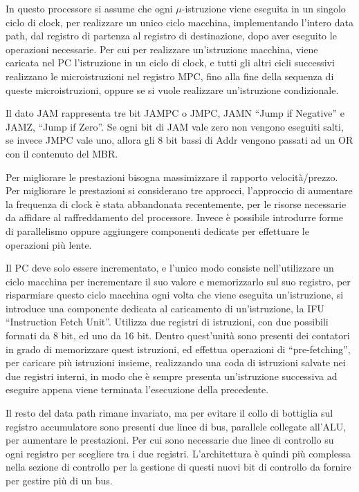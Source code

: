 \documentclass{article}
\numberwithin{equation}{subsection}
\begin{document}
In questo processore si assume che ogni $\mu$-istruzione viene eseguita in un singolo ciclo di clock, per realizzare un unico ciclo macchina, implementando l'intero data 
path, dal registro di partenza al registro di destinazione, dopo aver eseguito le operazioni necessarie. Per cui per realizzare un'istruzione macchina, viene caricata nel 
PC l'istruzione in un ciclo di clock, e tutti gli altri cicli successivi realizzano le microistruzioni nel registro MPC, fino alla fine della sequenza di queste 
microistruzioni, oppure se si vuole realizzare un'istruzione condizionale. 

Il dato JAM rappresenta tre bit JAMPC o JMPC, JAMN ``Jump if Negative'' e JAMZ, ``Jump if Zero''. Se ogni bit di JAM vale zero non vengono eseguiti salti, se invece JMPC vale 
uno, allora gli 8 bit bassi di Addr vengono passati ad un OR con il contenuto del MBR. 


Per migliorare le prestazioni bisogna massimizzare il rapporto velocità/prezzo. Per migliorare le prestazioni si considerano tre approcci, l'approccio di aumentare la frequenza 
di clock è stata abbandonata recentemente, per le risorse necessarie da affidare al raffreddamento del processore. Invece è possibile introdurre forme di parallelismo oppure 
aggiungere componenti dedicate per effettuare le operazioni più lente. 


Il PC deve solo essere incrementato, e l'unico modo consiste nell'utilizzare un ciclo macchina per incrementare il suo valore e memorizzarlo sul suo registro, per risparmiare 
questo ciclo macchina ogni volta che viene eseguita un'istruzione, si introduce una componente dedicata al caricamento di un'istruzione, la IFU ``Instruction Fetch Unit''. 
Utilizza due registri di istruzioni, con due possibili formati da 8 bit, ed uno da 16 bit. Dentro quest'unità sono presenti dei contatori in grado di memorizzare quest istruzioni, 
ed effettua operazioni di ``pre-fetching'', per caricare più istruzioni insieme, realizzando una coda di istruzioni salvate nei due registri interni, in modo che è sempre 
presenta un'istruzione successiva ad eseguire appena viene terminata l'esecuzione della precedente. 


Il resto del data path rimane invariato, ma per evitare il collo di bottiglia sul registro accumulatore sono presenti due linee di bus, parallele collegate all'ALU, per 
aumentare le prestazioni. Per cui sono necessarie due linee di controllo su ogni registro per scegliere tra i due registri. L'architettura è quindi più complessa nella sezione 
di controllo per la gestione di questi nuovi bit di controllo da fornire per gestire più di un bus. 
\end{document}
